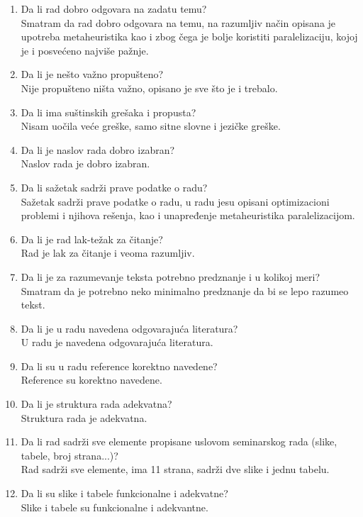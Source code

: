 \documentclass[a4paper]{report}
\begin{document}
\begin{enumerate}
\item Da li rad dobro odgovara na zadatu temu?\\
Smatram da rad dobro odgovara na temu, na razumljiv način opisana je upotreba metaheuristika kao i zbog čega je bolje koristiti paralelizaciju, kojoj je i posvećeno najviše pažnje.
\item Da li je nešto važno propušteno?\\
Nije propušteno ništa važno, opisano je sve što je i trebalo.
\item Da li ima suštinskih grešaka i propusta?\\
Nisam uočila veće greške, samo sitne slovne i jezičke greške.
\item Da li je naslov rada dobro izabran?\\
Naslov rada je dobro izabran.
\item Da li sažetak sadrži prave podatke o radu?\\
Sažetak sadrži prave podatke o radu, u radu jesu opisani optimizacioni problemi i njihova rešenja, kao i unapređenje metaheuristika paralelizacijom.
\item Da li je rad lak-težak za čitanje?\\
Rad je lak za čitanje i veoma razumljiv.
\item Da li je za razumevanje teksta potrebno predznanje i u kolikoj meri?\\
Smatram da je potrebno neko minimalno predznanje da bi se lepo razumeo tekst.
\item Da li je u radu navedena odgovarajuća literatura?\\
U radu je navedena odgovarajuća literatura.
\item Da li su u radu reference korektno navedene?\\
Reference su korektno navedene.
\item Da li je struktura rada adekvatna?\\
Struktura rada je adekvatna.
\item Da li rad sadrži sve elemente propisane uslovom seminarskog rada (slike, tabele, broj strana...)?\\
Rad sadrži sve elemente, ima 11 strana, sadrži dve slike i jednu tabelu.
\item Da li su slike i tabele funkcionalne i adekvatne?\\
Slike i tabele su funkcionalne i adekvantne.
\end{enumerate}
\end{document}

